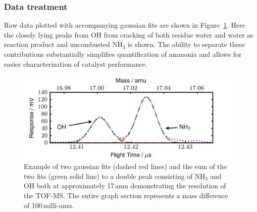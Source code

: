 \documentclass[aip,rsi]{revtex4-1}
\begin{document}
\subsubsection{Data treatment}
Raw data plotted with accompanying gaussian fits are shown in Figure~\ref{fig:gaussian_fit}. Here the closely lying peaks from OH from cracking of both residue water and water as reaction product and uncombusted NH$_3$ is shown. The ability to separate these contributions substantially simplifies quantification of ammonia and allows for easier characterization of catalyst performance. 
\begin{figure}
 \includegraphics[width=14cm]{ammonia_OH_gauss_fit.png}%
 \caption{Example of two gaussian fits (dashed red lines) and the sum of the two fits (green solid line) to a double peak consisting of NH$_{3}$ and OH both at approximately 17\,amu demonstrating the resolution of the TOF-MS. The entire graph section represents a mass difference of 100\,milli-amu.\label{fig:gaussian_fit}}%
\end{figure}
\end{document}
